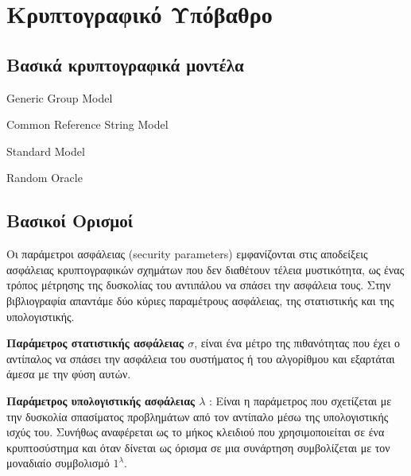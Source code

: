 \section{Κρυπτογραφικό Υπόβαθρο}

\subsection{Βασικά κρυπτογραφικά μοντέλα}

\begin{definition}
Generic Group Model
\end{definition}

\begin{definition}
Common Reference String Model
\end{definition}

\begin{definition}
Standard Model
\end{definition}

\begin{definition}
Random Oracle
\end{definition}

\subsection{Βασικοί Ορισμοί}

Οι παράμετροι ασφάλειας (security parameters) εμφανίζονται στις αποδείξεις ασφάλειας κρυπτογραφικών σχημάτων που δεν διαθέτουν τέλεια μυστικότητα, ως ένας τρόπος μέτρησης της δυσκολίας του αντιπάλου να σπάσει την ασφάλεια τους. Στην βιβλιογραφία απαντάμε δύο κύριες παραμέτρους ασφάλειας, της στατιστικής και της υπολογιστικής.

\begin{definition}
\textbf{Παράμετρος στατιστικής ασφάλειας $σ$}, είναι ένα μέτρο της πιθανότητας που έχει ο αντίπαλος να σπάσει την ασφάλεια του συστήματος ή του αλγορίθμου και εξαρτάται άμεσα με την φύση αυτών.
\end{definition}

\begin{definition}
\textbf{Παράμετρος υπολογιστικής ασφάλειας $λ$} : Είναι η παράμετρος που σχετίζεται με την δυσκολία σπασίματος προβλημάτων από τον αντίπαλο μέσω της υπολογιστικής ισχύς του. Συνήθως αναφέρεται ως το μήκος κλειδιού που χρησιμοποιείται σε ένα κρυπτοσύστημα και όταν δίνεται ως όρισμα σε μια συνάρτηση συμβολίζεται με τον μοναδιαίο συμβολισμό $1^λ$.
\end{definition}

